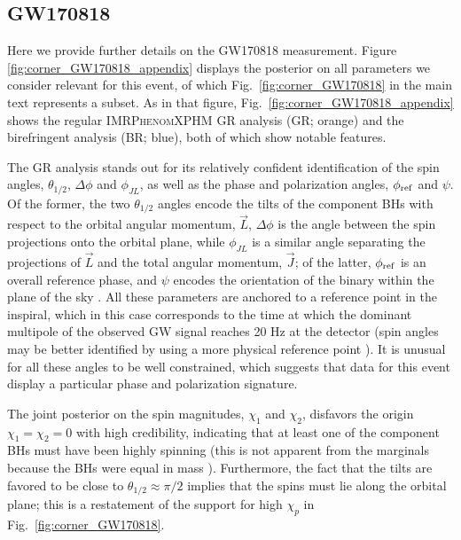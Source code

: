 \documentclass[aps,prd,twocolumn,superscriptaddress,preprintnumbers,floatfix,nofootinbib]{revtex4-2}
\begin{document}
\subsection{GW170818}
\label{sec:corner_GW170818_appendix}

Here we provide further details on the GW170818 measurement. 
Figure \ref{fig:corner_GW170818_appendix} displays the posterior on all parameters we consider relevant for this event, of which Fig.~\ref{fig:corner_GW170818} in the main text represents a subset.
As in that figure, Fig.~\ref{fig:corner_GW170818_appendix} shows the regular \textsc{IMRPhenomXPHM} \ac{GR} analysis (GR; orange) and the birefringent analysis (BR; blue), both of which show notable features.

The GR analysis stands out for its relatively confident identification of the spin angles, $\theta_{1/2}$, $\Delta \phi$ and $\phi_{JL}$, as well as the phase and polarization angles, $\phi_{\rm ref}$ and $\psi$.
Of the former, the two $\theta_{1/2}$ angles encode the tilts of the component \acp{BH} with respect to the orbital angular momentum, $\vec{L}$, $\Delta \phi$ is the angle between the spin projections onto the orbital plane, while $\phi_{JL}$ is a similar angle separating the projections of $\vec{L}$ and the total angular momentum, $\vec{J}$;
of the latter, $\phi_{\rm ref}$ is an overall reference phase, and $\psi$ encodes the orientation of the binary within the plane of the sky \cite{Isi:2022mbx}.
All these parameters are anchored to a reference point in the inspiral, which in this case corresponds to the time at which the dominant multipole of the observed \ac{GW} signal reaches 20 Hz at the detector (spin angles may be better identified by using a more physical reference point \cite{Varma:2021csh}).
It is unusual for all these angles to be well constrained, which suggests that data for this event display a particular phase and polarization signature.

The joint posterior on the spin magnitudes, $\chi_1$ and $\chi_2$, disfavors the origin $\chi_1 = \chi_2 = 0$ with high credibility, indicating that at least one of the component \acp{BH} must have been highly spinning (this is not apparent from the marginals because the \acp{BH} were equal in mass \cite{Biscoveanu:2020are}).
Furthermore, the fact that the tilts are favored to be close to $\theta_{1/2} \approx \pi/2$ implies that the spins must lie along the orbital plane;
this is a restatement of the support for high $\chi_p$ in Fig.~\ref{fig:corner_GW170818}.
\end{document}
